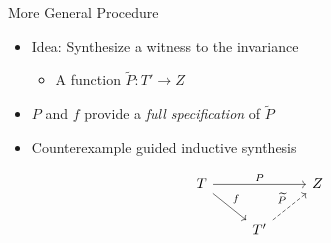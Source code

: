 \documentclass[usenames,dvipsnames]{beamer}
\begin{document}
\begin{frame}[fragile]{More General Procedure}
  \begin{itemize}
    \item Idea: Synthesize a witness to the invariance
    \begin{itemize}
      \item A function $\widetilde{P} : T' \to Z$
    \end{itemize}
    \item $P$ and $f$ provide a \emph{full specification} of $\widetilde{P}$
    \item Counterexample guided inductive synthesis
  \end{itemize}

  \[
    \begin{tikzcd}
      T \arrow{rr}{P} \arrow{rd}{f} &   & Z \\
      & T' \arrow[dashed]{ru}{\widetilde{P}} &   \\
    \end{tikzcd}
  \]
\end{frame}
\end{document}
